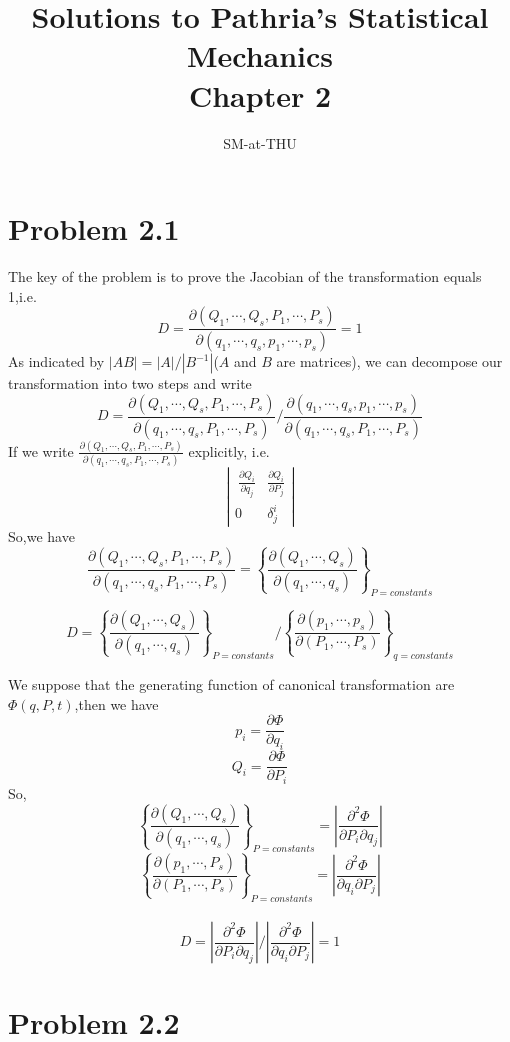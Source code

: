 \documentclass{article}
\author{SM-at-THU}
\title{\bf{Solutions to Pathria's Statistical Mechanics}\\Chapter 2}
\begin{document}
\maketitle
\section*{Problem 2.1}
The key of the problem is to prove the Jacobian of the transformation equals 1,i.e.
\[D=\frac{\partial (Q_1,\cdots,Q_s,P_1,\cdots,P_s)}{\partial (q_1,\cdots,q_s,p_1,\cdots,p_s)}=1\]
As indicated by $|A B|=|A|/|B^{-1}|$($A$ and $B$ are matrices), we can decompose our transformation into two steps and write
\[D=\frac{\partial (Q_1,\cdots,Q_s,P_1,\cdots,P_s)}{\partial (q_1,\cdots,q_s,P_1,\cdots,P_s)} \bigg/ \frac{\partial (q_1,\cdots,q_s,p_1,\cdots,p_s)}{\partial (q_1,\cdots,q_s,P_1,\cdots,P_s)}\]
If we write $\frac{\partial (Q_1,\cdots,Q_s,P_1,\cdots,P_s)}{\partial (q_1,\cdots,q_s,P_1,\cdots,P_s)}$ explicitly, i.e.
\[ \left| \begin{array}{cc}
 \ \frac{\partial Q_i}{\partial q_j} & \frac{\partial Q_i}{\partial P_j} \\
 0 & \delta^i_j
 \end{array} \right|\]
So,we have
\[\frac{\partial (Q_1,\cdots,Q_s,P_1,\cdots,P_s)}{\partial (q_1,\cdots,q_s,P_1,\cdots,P_s)}=
\left\{ \frac{\partial (Q_1,\cdots,Q_s)}{\partial (q_1,\cdots,q_s)}\right\} _{P=constants}\]

\[D=\left\{ \frac{\partial (Q_1,\cdots,Q_s)}{\partial (q_1,\cdots,q_s)}\right\} _{P=constants} \bigg/
  \left\{ \frac{\partial (p_1,\cdots,p_s)}{\partial (P_1,\cdots,P_s)}\right\} _{q=constants}\]
  
We suppose that the generating function of canonical transformation are $\Phi(q,P,t)$,then we have
\[p_i=\frac{\partial \Phi}{\partial q_i}\]
\[Q_i=\frac{\partial \Phi}{\partial P_i}\]
So,
\[\left\{ \frac{\partial (Q_1,\cdots,Q_s)}{\partial (q_1,\cdots,q_s)}\right\} _{P=constants}= \left| \frac{\partial^2 \Phi}{\partial P_i \partial q_j} \right|\]
\[\left\{ \frac{\partial (p_1,\cdots,P_s)}{\partial (P_1,\cdots,P_s)}\right\} _{P=constants}= \left| \frac{\partial^2 \Phi}{\partial q_i \partial P_j} \right|\]
\\
\[D=\left| \frac{\partial^2 \Phi}{\partial P_i \partial q_j} \right| \bigg/ 
\left| \frac{\partial^2 \Phi}{\partial q_i \partial P_j} \right| =1\]
\section*{Problem 2.2}
\end{document}

